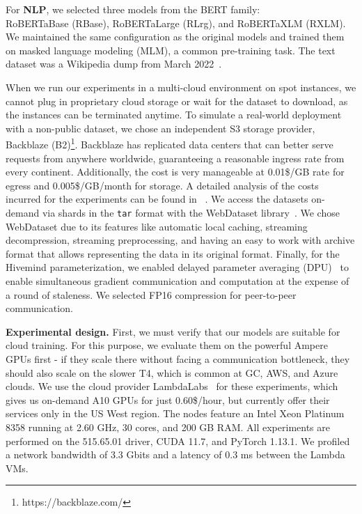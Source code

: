 For \textbf{NLP}, we selected three models from the BERT family:\\RoBERTaBase (RBase), RoBERTaLarge (RLrg), and RoBERTaXLM (RXLM).
We maintained the same configuration as the original models and trained them on masked language modeling (MLM), a common pre-training task.
The text dataset was a Wikipedia dump from March 2022~\cite{wikidump}.

When we run our experiments in a multi-cloud environment on spot instances, we cannot plug in proprietary cloud storage or wait for the dataset to download, as the instances can be terminated anytime.
To simulate a real-world deployment with a non-public dataset, we chose an independent S3 storage provider, Backblaze (B2)\footnote{https://backblaze.com/}.
Backblaze has replicated data centers that can better serve requests from anywhere worldwide, guaranteeing a reasonable ingress rate from every continent.
Additionally, the cost is very manageable at 0.01\$/GB rate for egress and 0.005\$/GB/month for storage.
A detailed analysis of the costs incurred for the experiments can be found in ~.
We access the datasets on-demand via shards in the \texttt{tar} format with the WebDataset library~\cite{aizman2019webdataset}.
We chose WebDataset due to its features like automatic local caching, streaming decompression, streaming preprocessing, and having an easy to work with archive format that allows representing the data in its original format.
Finally, for the Hivemind parameterization, we enabled delayed parameter averaging (DPU)~\cite{ren2021zerooffload} to enable simultaneous gradient communication and computation at the expense of a round of staleness. We selected FP16 compression for peer-to-peer communication.

\textbf{Experimental design.} First, we must verify that our models are suitable for cloud training.
For this purpose, we evaluate them on the powerful Ampere GPUs first - if they scale there without facing a communication bottleneck, they should also scale on the slower T4, which is common at GC, AWS, and Azure clouds.
We use the cloud provider LambdaLabs~\cite{lambdaweb} for these experiments, which gives us on-demand A10 GPUs for just 0.60\$/hour, but currently offer their services only in the US West region.
The nodes feature an Intel Xeon Platinum 8358 running at 2.60 GHz, 30 cores, and 200 GB RAM.
All experiments are performed on the 515.65.01 driver, CUDA 11.7, and PyTorch 1.13.1.
We profiled a network bandwidth of 3.3 Gbits and a latency of 0.3 ms between the Lambda VMs. 
   
